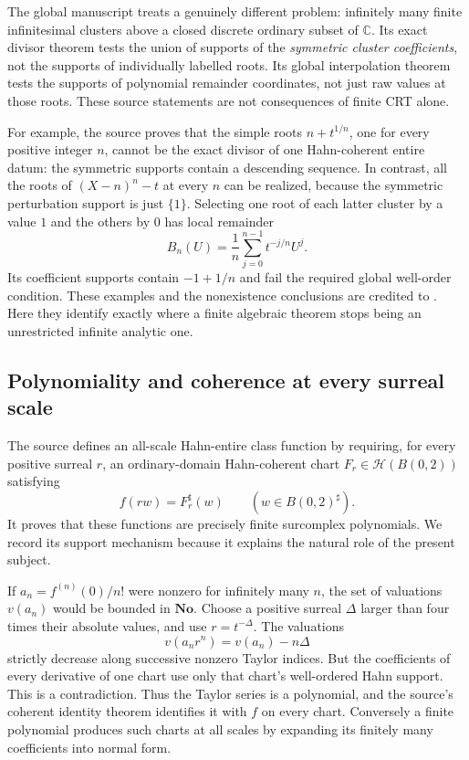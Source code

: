 \documentclass[11pt,letterpaper]{article}
\numberwithin{equation}{section}
\theoremstyle{definition}
\theoremstyle{remark}
\newcommand{\No}{\mathbf{No}}
\newcommand{\C}{\mathbb C}
\newcommand{\sh}{^{\sharp}}
\begin{document}
The global manuscript \cite{SourceGlobal} treats a genuinely different
problem: infinitely many finite infinitesimal clusters above a closed
discrete ordinary subset of $\C$. Its exact divisor theorem tests the
union of supports of the \emph{symmetric cluster coefficients}, not the
supports of individually labelled roots. Its global interpolation theorem
tests the supports of polynomial remainder coordinates, not just raw
values at those roots. These source statements are not consequences of
finite CRT alone.

For example, the source proves that the simple roots $n+t^{1/n}$, one
for every positive integer $n$, cannot be the exact divisor of one
Hahn-coherent entire datum: the symmetric supports contain a descending
sequence. In contrast, all the roots of $(X-n)^n-t$ at every $n$ can be
realized, because the symmetric perturbation support is just $\{1\}$.
Selecting one root of each latter cluster by a value $1$ and the others
by $0$ has local remainder
\[
 B_n(U)=\frac1n\sum_{j=0}^{n-1}t^{-j/n}U^j.
\]
Its coefficient supports contain $-1+1/n$ and fail the required global
well-order condition. These examples and the nonexistence conclusions
are credited to \cite{SourceGlobal}. Here they identify exactly where a
finite algebraic theorem stops being an unrestricted infinite analytic
one.

\subsection{Polynomiality and coherence at every surreal scale}
The source \cite{SourceAnalysis} defines an all-scale Hahn-entire class
function by requiring, for every positive surreal $r$, an ordinary-domain
Hahn-coherent chart $F_r\in\mathcal H(B(0,2))$ satisfying
\[
 f(rw)=F_r\sh(w)\qquad(w\in B(0,2)\sh).
\]
It proves that these functions are precisely finite surcomplex
polynomials. We record its support mechanism because it explains the
natural role of the present subject.

If $a_n=f^{(n)}(0)/n!$ were nonzero for infinitely many $n$, the set of
valuations $v(a_n)$ would be bounded in $\No$. Choose a positive surreal
$\Delta$ larger than four times their absolute values, and use
$r=t^{-\Delta}$. The valuations
\[
 v(a_nr^n)=v(a_n)-n\Delta
\]
strictly decrease along successive nonzero Taylor indices. But the
coefficients of every derivative of one chart use only that chart's
well-ordered Hahn support. This is a contradiction. Thus the Taylor
series is a polynomial, and the source's coherent identity theorem
identifies it with $f$ on every chart. Conversely a finite polynomial
produces such charts at all scales by expanding its finitely many
coefficients into normal form.
\end{document}
